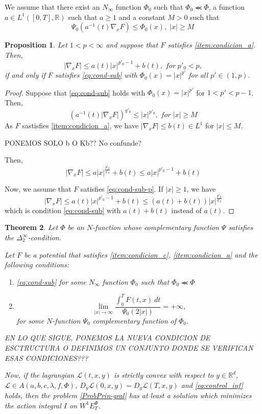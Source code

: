 \documentclass[twoside]{article}
\newtheorem{thm}{Theorem}[section]
\newtheorem{prop}[thm]{Proposition}
\theoremstyle{remark}
\newcommand{\ephi}{E^{\Phi}}
\newcommand{\wphie}{W^{1}\ephi}
\newcommand{\rr}{\mathbb{R}}
\renewcommand{\leq}{\leqslant}
\renewcommand{\geq}{\geqslant}
\begin{document}
We assume that there exist an $N_\infty$ function $\Phi_0$ such that $\Phi_0 \llcurly \Phi$,
a function $a \in  L^1([0,T],\rr)$ such that $a\geq 1$ and a constant $M>0$ such that
\begin{equation}\label{eq:cond-sub}
\Psi_0(a^{-1}(t)\nabla_x F)\leq \Phi_0(x),\;|x|\geq M\,\tag{Sub}
\end{equation}

\begin{prop}
Let $1<p<\infty$ and suppose that $F$ satisfies  \ref{item:condicion_a}. Then,
\begin{equation}\label{eq:cond-sub-p}
|\nabla_x F|\leq a(t)|x|^{p'_0-1}+b(t),\;for\; p'_0<p,
\end{equation}
 if and only if
$F$ satisfies \eqref{eq:cond-sub} with $\Phi_0(x)=|x|^{p'}$ for all $p'\in(1,p)$.
\end{prop}

\begin{proof}
Suppose that \eqref{eq:cond-sub} holds with $\Phi_0(x)=|x|^{p'}$ for $1<p'<p-1$. Then,
\[
(a^{-1}(t)|\nabla_x F|)^{q'_0}\leq |x|^{p'_0},\;for\; |x|\geq M
\]
As $F$ sastisfies \ref{item:condicion_a}, we have
$|\nabla_x F|\leq b(t)\in L^1$ for $|x|\leq M$.

PONEMOS SOLO b O Kb?? No confunde?

Then,
\[
|\nabla_x F|\leq a |x|^{\frac{p'_0}{q'_0}}+b(t)\leq a|x|^{p'_0-1}+b(t)
\]

Now, we assume that $F$ satisfies \eqref{eq:cond-sub-p}. If $|x|\geq 1$, we have
\[
|\nabla_x F|\leq a(t)|x|^{p'_0-1}+b(t)\leq (a(t)+b(t))|x|^{\frac{p'_0}{q'_0}}
\]
which is condition \eqref{eq:cond-sub} with $a(t)+b(t)$ instead of $a(t)$.
\end{proof}


\begin{thm}\label{coercitividad-r}
Let $\Phi$ be an $N$-function whose complementary function $\Psi$ satisfies the $\Delta_2^{\infty}$-condition.

Let $F$ be a potential that satisfies \ref{item:condicion_c}, \ref{item:condicion_a} and the following conditions:
\begin{enumerate}
\item \eqref{eq:cond-sub} for some $N_{\infty}$ function $\Phi_0$ such that $\Phi_0\llcurly \Phi$
\item
\begin{equation}\label{eq:propiedad-coercividad-phi0}
\lim_{|x|\to\infty}\frac{\int_{0}^{T}F(t,x)\ dt}{\Psi_0(2|x|)}=+\infty,
\end{equation}
for some $N$-function $\Psi_0$ complementary function of $\Phi_0$.
\end{enumerate}

EN LO QUE SIGUE, PONEMOS LA NUEVA CONDICION DE ESCTRUCTURA O DEFINIMOS UN CONJUNTO DONDE SE VERIFICAN
ESAS CONDICIONES???

Now,  if the lagrangian $\mathcal{L}(t,x,y)$ is strictly convex  with respect to $y\in\rr^d$,
$\mathcal{L}\in {A}(a,b,c,\lambda,f,\Phi)$,
$D_y\mathcal{L}(0,x,y)=D_y\mathcal{L}(T,x,y)$
and \eqref{eq:control_inf} holds,
then the problem \eqref{ProbPrin-gral} has at least a solution which minimizes the action integral $I$ on $\wphie_T$.
\end{thm}
\end{document}
